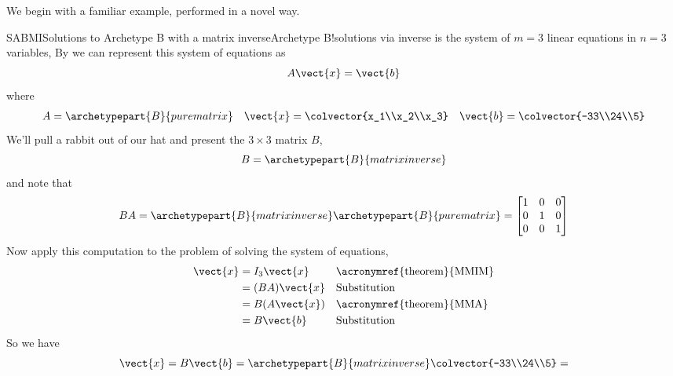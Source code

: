 %
We begin with a familiar example, performed in a novel way.
%
\begin{example}{SABMI}{Solutions to Archetype B with a matrix inverse}{Archetype B!solutions via inverse}
%
 is the system of $m=3$ linear equations in $n=3$ variables,
%
%
By  we can represent this system of equations as
%
\begin{equation*}
A\vect{x}=\vect{b}
\end{equation*}
%
where
%
\begin{align*}
A=\archetypepart{B}{purematrix}&&\vect{x}=\colvector{x_1\\x_2\\x_3}&&\vect{b}=\colvector{-33\\24\\5}
\end{align*}
%
We'll pull a rabbit out of our hat and present the $3\times 3$ matrix $B$,
%
\begin{equation*}
B=\archetypepart{B}{matrixinverse}
\end{equation*}
%
and note that
%
\begin{equation*}
BA=\archetypepart{B}{matrixinverse}\archetypepart{B}{purematrix}=
\begin{bmatrix}
1 & 0 & 0\\
0 & 1 & 0\\
0 & 0 & 1
\end{bmatrix}
\end{equation*}
%
Now apply this computation to the problem of solving the system of equations,
%
\begin{align*}
\vect{x}
&=I_3\vect{x}&&\text{\acronymref{theorem}{MMIM}}\\
&=(BA)\vect{x}&&\text{Substitution}\\
&=B(A\vect{x})&&\text{\acronymref{theorem}{MMA}}\\
&=B\vect{b}&&\text{Substitution}\\
\end{align*}
%
So we have
%
\begin{equation*}
\vect{x}=B\vect{b}=
\archetypepart{B}{matrixinverse}\colvector{-33\\24\\5}=

\end{equation*}
\end{example}
